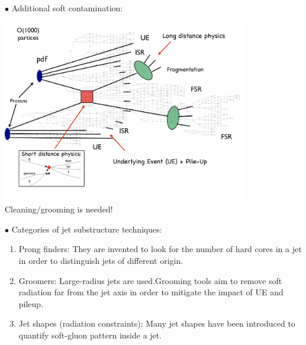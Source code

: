 \documentclass[9pt,a4paper,unknownkeysallowed,xcolor=dvipsnames,aspectratio=43]{beamer}
\begin{document}
%
%
%
\begin{frame}

\vspace{2mm}
{\color{darkred}\Large$\bullet$} Additional soft contamination:
\vspace{2mm}
\begin{center}
\includegraphics[width=0.8\textwidth]{05/tth.pdf}\\\vspace{2mm}
{\color{darkred}Cleaning/grooming is needed!}
\end{center}
\end{frame}
%
%
%
\begin{frame}

\vspace{2mm}
{\color{darkred}\Large$\bullet$} {\color{darkred}Categories of jet substructure techniques:}
\vspace{8mm}
\begin{enumerate}
    \item {\color{darkred}Prong finders}: They are invented to look for the number of hard cores in a jet in order to distinguish jets of different origin.
    \vspace{8mm}
    \item {\color{darkred}Groomers:} Large-radius jets are used.Grooming tools aim to remove soft radiation far from the jet axis in order to mitigate the impact of UE and pileup.
    \vspace{8mm}
    \item {\color{darkred}Jet shapes} (radiation constraints): Many jet shapes have been introduced to quantify soft-gluon pattern inside a jet.
\end{enumerate}
\end{frame}
\end{document}
